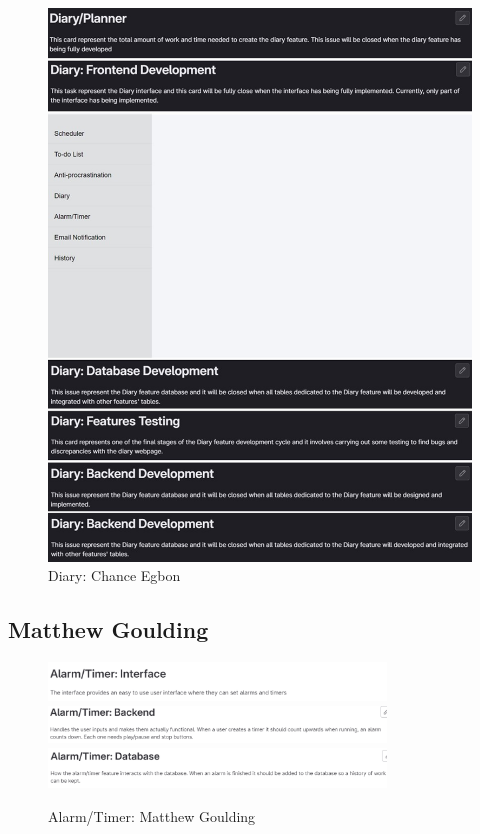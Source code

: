 \documentclass[a4paper]{article}
\begin{document}
\begin{figure}[H]
	\centering
	\includegraphics[width=1\textwidth]{./images/Diary.jpg}
	\caption*{Diary: Chance Egbon}
	\label{Fig.Diary}
\end{figure}

\subsection{Matthew Goulding}

\begin{figure}[H]
	\centering
	\includegraphics[width=0.8\textwidth]{./images/Alarm_Interface.png}
	\includegraphics[width=0.8\textwidth]{./images/Alarm_Backend.png}
	\includegraphics[width=0.8\textwidth]{./images/Alarm_Database.png}
	\caption*{Alarm/Timer: Matthew Goulding}
	\label{Fig.Alarm}
\end{figure}
\end{document}
